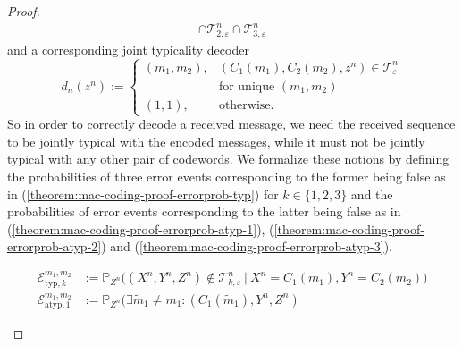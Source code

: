 \documentclass[journal]{IEEEtran}
\newcommand{\channelInOne}{X}
\newcommand{\channelInTwo}{Y}
\newcommand{\channelOut}{Z}
\newcommand{\channelOutAlphElement}{z}
\newcommand{\codebookOneWord}[1]{C_1(#1)}
\newcommand{\codebookTwoWord}[1]{C_2(#1)}
\newcommand{\codewordIndex}{m}
\newcommand{\codebookBlocklength}{n}
\newcommand{\Probability}{\mathbb{P}}
\newcommand{\typicalityParam}{\varepsilon}
\newcommand{\typicalSetIndex}[3]{\mathcal{T}_{#3,#1}^{#2}}
\newcommand{\typicalSet}[2]{\mathcal{T}_{#1}^{#2}}
\newcommand{\codebookDecoder}{d}
\newcommand{\errorprob}{\mathcal{E}}
\newcommand{\indexForTypicalSet}{k}
\begin{document}
\begin{proof}
\begin{align*}
\cap
\typicalSetIndex{\typicalityParam}{\codebookBlocklength}{2}
\cap
\typicalSetIndex{\typicalityParam}{\codebookBlocklength}{3}
\end{align*}
and a corresponding joint typicality decoder
\[
\codebookDecoder_\codebookBlocklength(\channelOutAlphElement^\codebookBlocklength) :=
\begin{cases}
  (\codewordIndex_1, \codewordIndex_2), &(\codebookOneWord{\codewordIndex_1}, \codebookTwoWord{\codewordIndex_2}, \channelOutAlphElement^\codebookBlocklength)
                                         \in \typicalSet{\typicalityParam}{\codebookBlocklength}
\\
                                        &\text{for unique $(\codewordIndex_1, \codewordIndex_2)$}
\\
  (1,1), &\text{otherwise.}
\end{cases}
\]
So in order to correctly decode a received message, we need the received sequence to be jointly typical with the encoded messages, while it must not be jointly typical with any other pair of codewords. We formalize these notions by defining the probabilities of three error events corresponding to the former being false as in (\ref{theorem:mac-coding-proof-errorprob-typ}) for $\indexForTypicalSet \in \{1,2,3\}$ and the probabilities of error events corresponding to the latter being false as in (\ref{theorem:mac-coding-proof-errorprob-atyp-1}), (\ref{theorem:mac-coding-proof-errorprob-atyp-2}) and (\ref{theorem:mac-coding-proof-errorprob-atyp-3}).
\begin{figure*}
\normalsize
\begin{align}
\label{theorem:mac-coding-proof-errorprob-typ}
\errorprob_{\mathrm{typ},\indexForTypicalSet}^{\codewordIndex_1, \codewordIndex_2}
&:=
    \Probability_{\channelOut^\codebookBlocklength} \Big(
      (\channelInOne^\codebookBlocklength, \channelInTwo^\codebookBlocklength, \channelOut^\codebookBlocklength)
      \notin
      \typicalSetIndex{\typicalityParam}{\codebookBlocklength}{\indexForTypicalSet}
      ~\big|~
      \channelInOne^\codebookBlocklength = \codebookOneWord{\codewordIndex_1}, \channelInTwo^\codebookBlocklength = \codebookTwoWord{\codewordIndex_2}
    \Big)
\\
\label{theorem:mac-coding-proof-errorprob-atyp-1}
\errorprob_{\mathrm{atyp},1}^{\codewordIndex_1, \codewordIndex_2}
&:=
    \Probability_{\channelOut^\codebookBlocklength} \Big(
      \exists \tilde{\codewordIndex}_1 \neq \codewordIndex_1 :
      (\codebookOneWord{\tilde{\codewordIndex}_1}, \channelInTwo^\codebookBlocklength, \channelOut^\codebookBlocklength)

\end{align}
\end{figure*}
\end{proof}
\end{document}

